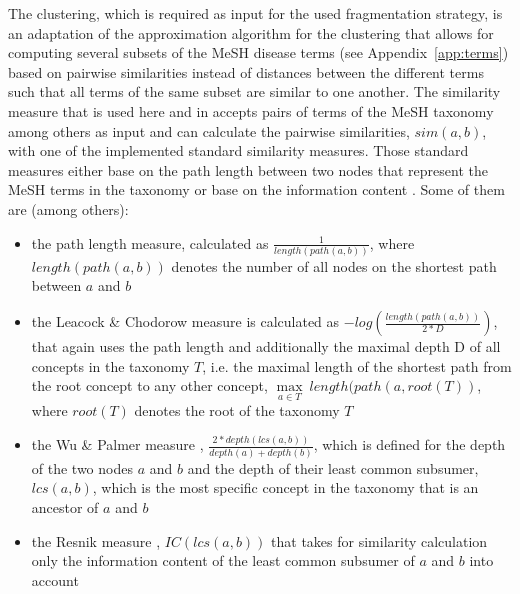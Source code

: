 The clustering, which is required as input for the used fragmentation strategy, is an adaptation of the approximation algorithm 
\citep{Gonzales1985} for the clustering that allows for computing several subsets of the MeSH disease terms (see Appendix~\ref{app:terms}) based on pairwise 
similarities instead of distances between the different terms such that all terms of the same subset are similar to one another. The similarity measure 
\citep{McInnes2009} that is used here and in \citet{Wiese2014} accepts pairs of terms of the MeSH taxonomy among others as input and can calculate the
pairwise similarities, $sim(a,b)$, with one of the implemented standard similarity measures. Those standard measures either base on the path length between
two nodes that represent the MeSH terms in the taxonomy or base on the information content \citep{Resnik1995}. Some of them are (among others):
\begin{itemize}
    \item the path length measure, calculated as $\frac{1}{length(path(a,b))}$, where $length(path(a,b))$ denotes the number of all nodes on the shortest path 
        between $a$ and $b$
    \item the Leacock \& Chodorow measure \citep{Leacock1998} is calculated as $-log(\frac{length(path(a,b))}{2*D})$, that again uses the path length and
        additionally the maximal depth D of all concepts in the taxonomy $T$, i.e. the maximal length of the shortest path from the root concept to any other
        concept, $\max\limits_{a \in T}~length(path(a, root(T))$, where $root(T)$ denotes the root of the taxonomy $T$
    \item the Wu \& Palmer measure \citep{Wu1994}, $\frac{2*depth(lcs(a,b))}{depth(a)+depth(b)}$, which is defined for the depth of the two nodes $a$ and 
        $b$ and the depth of their least common subsumer, $lcs(a,b)$, which is the most specific concept in the taxonomy that is an ancestor of $a$ and $b$
    \item the Resnik measure \citep{Resnik1995}, $IC(lcs(a,b))$ that takes for similarity calculation only the information content of the least common 
        subsumer of $ a$ and $b$ into account
\end{itemize}



